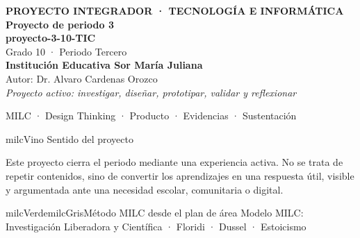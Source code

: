 \documentclass[11pt,letterpaper]{article}
\begin{document}
\thispagestyle{empty}

\vspace*{.85cm}
\begin{tcolorbox}[
  enhanced,colback=milcVino,colframe=milcVino,arc=12mm,width=.86\textwidth,
  boxrule=0pt,left=12mm,right=12mm,top=11mm,bottom=11mm,center,
  overlay={\draw[milcMagenta,line width=2pt,dash pattern=on 9pt off 8pt,rounded corners=10mm]
  ([xshift=7mm,yshift=-7mm]frame.north west) rectangle ([xshift=-7mm,yshift=7mm]frame.south east);}]
  \centering
  {\sffamily\bfseries\color{white}\fontsize{15}{17}\selectfont PROYECTO INTEGRADOR · TECNOLOGÍA E INFORMÁTICA}\\[1.0cm]
  {\sffamily\bfseries\color{white}\fontsize{30}{33}\selectfont Proyecto de periodo 3}\\[3mm]
  {\sffamily\bfseries\color{milcMostaza}\fontsize{25}{28}\selectfont proyecto-3-10-TIC}\\[8mm]
  {\sffamily\color{white}\Large Grado 10 · Periodo Tercero}\\[1.0cm]
  {\sffamily\bfseries\color{white}\large Institución Educativa Sor María Juliana}\\[2mm]
  {\sffamily\color{white}Autor: Dr. Alvaro Cardenas Orozco}\\[4mm]
  {\sffamily\itshape\color{white}Proyecto activo: investigar, diseñar, prototipar, validar y reflexionar}
\end{tcolorbox}
\vfill
\begin{tcolorbox}[enhanced,colback=milcVino!72!black,colframe=milcVino!72!black,arc=5mm,boxrule=0pt,width=.86\textwidth,left=6mm,right=6mm,top=4mm,bottom=4mm,center]
{\color{white}\sffamily\small MILC · Design Thinking · Producto · Evidencias · Sustentación}
\end{tcolorbox}

\newpage
\begin{titlebox}{milcVino}
Sentido del proyecto
\end{titlebox}
\begin{multicols}{2}
Este proyecto cierra el periodo mediante una experiencia activa. No se trata de repetir contenidos, sino de convertir los aprendizajes en una respuesta útil, visible y argumentada ante una necesidad escolar, comunitaria o digital.

\columnbreak
\begin{softbox}{milcVerde}{milcGris}{Método MILC desde el plan de área}
Modelo MILC: Investigación Liberadora y Científica · Floridi · Dussel · Estoicismo
\end{softbox}
\end{multicols}
\end{document}
